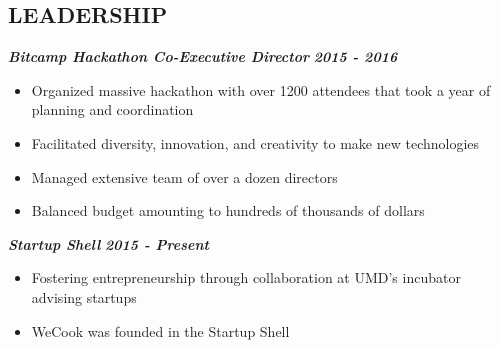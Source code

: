 \documentclass{res}
\begin{document}
\begin{resume}
\section{LEADERSHIP}
  	{\bfseries {\em Bitcamp Hackathon Co-Executive Director}} \hfill {\bfseries {\em 2015 - 2016}} \
		\begin{itemize} \itemsep -2pt %
		\item Organized massive hackathon with over 1200 attendees that took a year of planning and coordination
		\item Facilitated diversity, innovation, and creativity to make new technologies
		\item Managed extensive team of over a dozen directors
		\item Balanced budget amounting to hundreds of thousands of dollars
		\end{itemize}
	{\bfseries {\em Startup Shell}} \hfill {\bfseries {\em 2015 - Present}} \
		\begin{itemize} \itemsep -2pt %
		\item Fostering entrepreneurship through collaboration at UMD's incubator advising startups
		\item WeCook was founded in the Startup Shell
		\end{itemize}

\end{resume}
\end{document}
